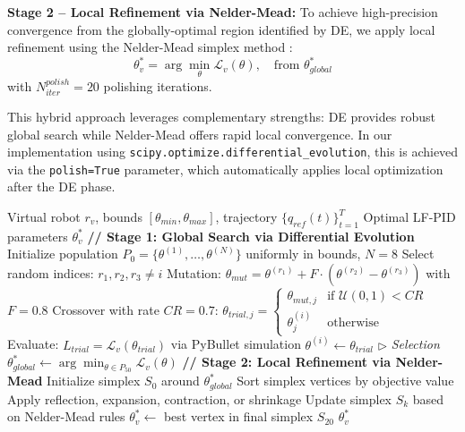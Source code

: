 \documentclass[DTMColor]{ROB-New}
\newcommand{\rev}[1]{{\color{blue}#1}}
\begin{document}
\textbf{Stage 2 -- Local Refinement via Nelder-Mead:} To achieve high-precision convergence from the globally-optimal region identified by DE, we apply local refinement using the Nelder-Mead simplex method \cite{nelder1965simplex}:
\begin{equation}
    \theta^*_v = \arg\min_{\theta} \mathcal{L}_v(\theta), \quad \text{from } \theta^*_{global}
\end{equation}
with $N_{iter}^{polish}=20$ polishing iterations.

This hybrid approach leverages complementary strengths: DE provides robust global search while Nelder-Mead offers rapid local convergence. In our implementation using \texttt{scipy.optimize.differential\_evolution}, this is achieved via the \texttt{polish=True} parameter, which automatically applies local optimization after the DE phase.

\begin{algorithm}[h]
\caption{Hybrid LF-PID Optimization for Virtual Robots}
\label{alg:hybrid_optimization}
\begin{algorithmic}[1]
\REQUIRE Virtual robot $r_v$, bounds $[\theta_{min}, \theta_{max}]$, trajectory $\{q_{ref}(t)\}_{t=1}^T$
\ENSURE Optimal LF-PID parameters $\theta^*_v$
\STATE \textbf{// Stage 1: Global Search via Differential Evolution}
\STATE Initialize population $P_0 = \{\theta^{(1)}, \ldots, \theta^{(N)}\}$ uniformly in bounds, $N=8$
        \STATE Select random indices: $r_1, r_2, r_3 \neq i$
        \STATE Mutation: 
        \STATE \quad $\theta_{mut} = \theta^{(r_1)} + F \cdot (\theta^{(r_2)} - \theta^{(r_3)})$ \quad with \rev{$F=0.8$}
        \STATE Crossover with rate $CR=0.7$:
        \STATE \quad $\theta_{trial,j} = \begin{cases} 
        \theta_{mut,j} & \text{if } \mathcal{U}(0,1) < CR \\
        \theta^{(i)}_j & \text{otherwise}
        \end{cases}$
        \STATE Evaluate: $L_{trial} = \mathcal{L}_v(\theta_{trial})$ via PyBullet simulation
            \STATE $\theta^{(i)} \gets \theta_{trial}$ \hfill $\triangleright$ \textit{Selection}
        \ENDIF
    \ENDFOR
\ENDFOR
\STATE $\theta^*_{global} \gets \arg\min_{\theta \in P_{50}} \mathcal{L}_v(\theta)$
\STATE 
\STATE \textbf{// Stage 2: Local Refinement via Nelder-Mead}
\STATE Initialize simplex $S_0$ around $\theta^*_{global}$
    \STATE Sort simplex vertices by objective value
    \STATE Apply reflection, expansion, contraction, or shrinkage
    \STATE Update simplex $S_k$ based on Nelder-Mead rules
\ENDFOR
\STATE $\theta^*_v \gets$ best vertex in final simplex $S_{20}$
\RETURN $\theta^*_v$
\end{algorithmic}
\end{algorithm}
\end{document}
